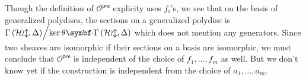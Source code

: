 \begin{remark} Though the definition of $\mathcal{O}^{\mathsf{pre}}$ explicity uses $f_{i}$'s, we see that on the basis of generalized polydiscs, the sections on a generalized polydisc is $\quotient{\sections{\sheafHol}{\Delta}}{\ker\theta\smul\sections{\sheafHol}{\Delta}}$ which does not mention any generators. Since two sheaves are isomorphic if their sections on a basis are isomorphic, we must conclude that $\mathcal{O}^{\mathsf{pre}}$ is independent of the choice of $f_{1},\dots,f_{m}$ as well. But we don't know yet if the construction is independent from the choice of $a_{1},\dots, a_{m}$.
\end{remark}

